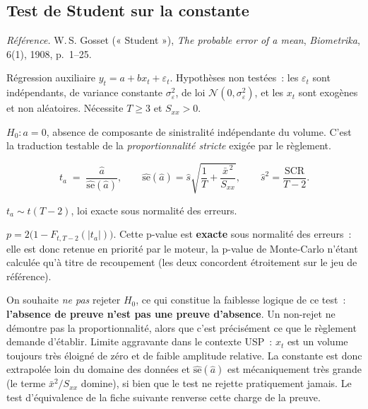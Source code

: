 \documentclass[a4paper,11pt]{article}
\newcommand{\refl}[1]{{\small\textcolor{maincolor!70!black}{\textit{Référence.} #1}}\par\smallskip}
\newcounter{ficheid}
\newenvironment{fiche}[1]{%
  \stepcounter{ficheid}%
  \phantomsection
  \subsection{#1}%
  \label{fiche:\theficheid}%
}{%
  \end{description}\vspace{0.5em}%
}
\newcommand{\Cadre}{%
  \begin{description}[leftmargin=0pt, style=unboxed, itemsep=3pt, topsep=3pt, parsep=2pt]%
  \item[\textcolor{financeblue}{\textbf{1. Cadre, notations et hypothèses de validité (non testées).}}]}
\newcommand{\Hzero}{\item[\textcolor{financeblue}{\textbf{2. Hypothèse nulle.}}]}
\newcommand{\Stat}{\item[\textcolor{financeblue}{\textbf{3. Statistique de test.}}]}
\newcommand{\Loi}{\item[\textcolor{financeblue}{\textbf{4. Loi sous $H_0$.}}]}
\newcommand{\Pval}{\item[\textcolor{financeblue}{\textbf{5. p-value.}}]}
\newcommand{\Usage}{\item[\textcolor{financeblue}{\textbf{6. Usage et limites.}}]}
\begin{document}
\begin{fiche}{Test de Student sur la constante}
\refl{W.\,S. Gosset (« Student »), \emph{The probable error of a mean}, \emph{Biometrika}, 6(1),
1908, p.~1--25.}
\Cadre
Régression auxiliaire $y_t = a + b x_t + \varepsilon_t$. Hypothèses non testées~: les
$\varepsilon_t$ sont indépendants, de variance constante $\sigma_\varepsilon^2$, de loi
$\mathcal{N}(0,\sigma_\varepsilon^2)$, et les $x_t$ sont exogènes et non aléatoires. Nécessite
$T \ge 3$ et $S_{xx} > 0$.
\Hzero
$H_0 : a = 0$, absence de composante de sinistralité indépendante du volume. C'est la traduction
testable de la \emph{proportionnalité stricte} exigée par le règlement.
\Stat
\[
  t_a \;=\; \frac{\hat a}{\widehat{\mathrm{se}}(\hat a)},
  \qquad
  \widehat{\mathrm{se}}(\hat a) = \hat s \sqrt{\frac{1}{T} + \frac{\bar x^{\,2}}{S_{xx}}},
  \qquad \hat s^2 = \frac{\mathrm{SCR}}{T-2}.
\]
\Loi
$t_a \sim t(T-2)$, loi exacte sous normalité des erreurs.
\Pval
$p = 2\big(1 - F_{t,T-2}(|t_a|)\big)$. Cette p-value est \textbf{exacte} sous normalité des
erreurs~: elle est donc retenue en priorité par le moteur, la p-value de Monte-Carlo n'étant
calculée qu'à titre de recoupement (les deux concordent étroitement sur le jeu de référence).
\Usage
On souhaite \emph{ne pas} rejeter $H_0$, ce qui constitue la faiblesse logique de ce test~:
\textbf{l'absence de preuve n'est pas une preuve d'absence}. Un non-rejet ne démontre pas la
proportionnalité, alors que c'est précisément ce que le règlement demande d'établir. Limite
aggravante dans le contexte USP~: $x_t$ est un volume toujours très éloigné de zéro et de faible
amplitude relative. La constante est donc extrapolée loin du domaine des données et
$\widehat{\mathrm{se}}(\hat a)$ est mécaniquement très grande (le terme $\bar x^2/S_{xx}$ domine),
si bien que le test ne rejette pratiquement jamais. Le test d'équivalence de la fiche suivante
renverse cette charge de la preuve.
\end{fiche}
\end{document}
